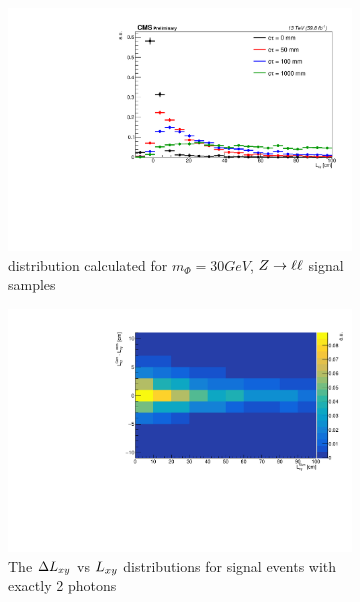 \begin{figure}[htb!]
	\centering
	\captionsetup[subfigure]{justification=centering}
	\begin{subfigure}[h]{0.45\linewidth}
		\centering
		\includegraphics[width=\linewidth]{figs/05_analysis/2018_signalLxy_comparison.pdf}
		\caption{\lxy distribution calculated for $m_\Phi=30\unit{GeV}$, $Z\to\ell\ell$ signal samples}
		\label{fig:lxys_a}
	\end{subfigure}
	\begin{subfigure}[h]{0.45\linewidth}
		\centering
		\includegraphics[width=\linewidth]{figs/05_analysis/2018_deltaLxyVsLxy_Z_m30.pdf}
		\caption{The $\Delta L_{xy}$ vs $L_{xy}$ distributions for signal events with exactly 2 photons}
		\label{fig:lxys_b}
	\end{subfigure}
	\begin{subfigure}[h]{0.45\linewidth}

\end{subfigure}
\end{figure}
